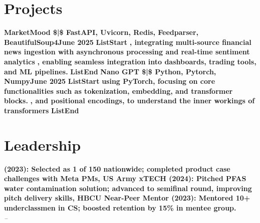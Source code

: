 \documentclass[letterpaper,11pt]{article}
\begin{document}
\section{Projects}
\textbf{MarketMood \$|\$ FastAPI, Uvicorn, Redis, Feedparser, BeautifulSoup4June 2025}
\textbf{ListStart}
\textbf{, integrating multi-source financial news ingestion  with asynchronous processing and real-time sentiment analytics}
\textbf{, enabling seamless integration into dashboards, trading tools, and ML pipelines.}
\textbf{ListEnd}
\textbf{Nano GPT \$|\$ Python, Pytorch, NumpyJune 2025}
\textbf{ListStart}
\textbf{using PyTorch, focusing on core functionalities such as tokenization, embedding, and transformer blocks.}
\textbf{, and positional encodings, to understand the inner workings of transformers}
\textbf{ListEnd}




\section{Leadership}
\textbf{(2023): Selected as 1 of 150 nationwide; completed product case challenges with Meta PMs,
US Army xTECH (2024): Pitched PFAS water contamination solution; advanced to semifinal round, improving pitch delivery skills,
HBCU Near-Peer Mentor (2023): Mentored 10+ underclassmen in CS; boosted retention by 15\% in mentee group.} \hfill  \\
\textit{} \hfill \textit{ -- }
\vspace{2pt}
\end{document}
